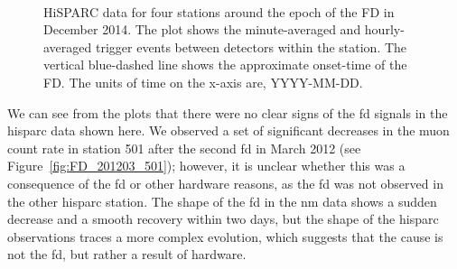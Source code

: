 \begin{figure}[ht]
	\centering
	 \\
	
	\qquad
	
	
	\caption{HiSPARC data for four stations around the epoch of the FD in December 2014. The plot shows the minute-averaged and hourly-averaged trigger events between detectors within the station. The vertical blue-dashed line shows the approximate onset-time of the FD. The units of time on the x-axis are, YYYY-MM-DD.}
	\label{fig:FD_201412}
\end{figure}


We can see from the plots that there were no clear signs of the \gls{fd} signals in the \gls{hisparc} data shown here. We observed a set of significant decreases in the muon count rate in station 501 after the second \gls{fd} in March 2012 (see Figure~\ref{fig:FD_201203_501}); however, it is unclear whether this was a consequence of the \gls{fd} or other hardware reasons, as the \gls{fd} was not observed in the other \gls{hisparc} station. The shape of the \gls{fd} in the \gls{nm} data shows a sudden decrease and a smooth recovery within two days, but the shape of the \gls{hisparc} observations traces a more complex evolution, which suggests that the cause is not the \gls{fd}, but rather a result of hardware.

